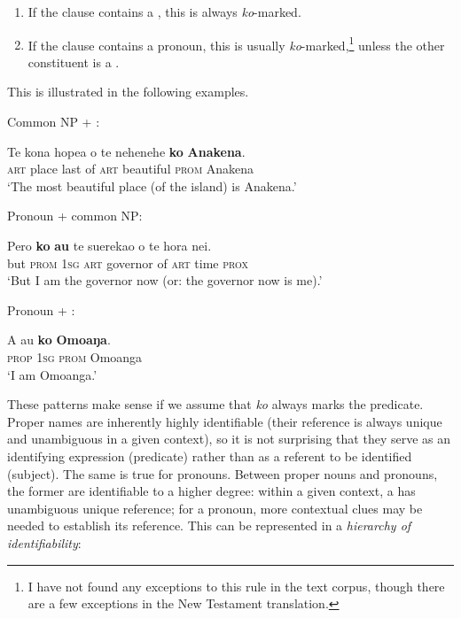 \begin{enumerate}
\item 
If the clause contains a , this is always \textit{ko}{}-marked.

\item 
If the clause contains a pronoun, this is usually \textit{ko}{}-marked,\footnote{\label{fn:462}I have not found any exceptions to this rule in the text corpus, though there are a few exceptions in the New Testament translation.} unless the other constituent is a .

\end{enumerate}

This is illustrated in the following examples.

Common NP + :

\ea\label{ex:9.12}
\gll Te kona hope{\ꞌ}a o te nehenehe \textbf{ko} \textbf{{\ꞌ}Anakena}. \\
\textsc{art} place last of \textsc{art} beautiful \textsc{prom} Anakena \\

\glt
‘The most beautiful place (of the island) is Anakena.’ \textstyleExampleref{[R350.013]} 
\z

Pronoun + common NP:

\ea\label{ex:9.13}
\gll Pero \textbf{ko} \textbf{au} te suerekao o te hora nei. \\
but \textsc{prom} \textsc{1sg} \textsc{art} governor of \textsc{art} time \textsc{prox} \\

\glt
‘But I am the governor now (or: the governor now is me).’ \textstyleExampleref{[R201.007]} 
\z

Pronoun + :

\ea\label{ex:9.14}
\gll A au \textbf{ko} \textbf{Omoaŋa}. \\
\textsc{prop} \textsc{1sg} \textsc{prom} Omoanga \\

\glt
‘I am Omoanga.’ \textstyleExampleref{[R314.101]} 
\z

These patterns make sense if we assume that \textit{ko} always marks the predicate. Proper names are inherently highly identifiable (their reference is always unique and unambiguous in a given context), so it is not surprising that they serve as an identifying expression (predicate) rather than as a referent to be identified (subject). The same is true for pronouns. Between proper nouns and pronouns, the former are identifiable to a higher degree: within a given context, a  has unambiguous unique reference; for a pronoun, more contextual clues may be needed to establish its reference. This can be represented in a \textit{hierarchy of identifiability}:

